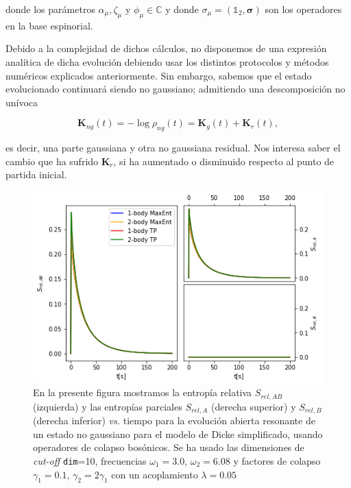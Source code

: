 \documentclass{report} %
\numberwithin{equation}{section}
\begin{document}
donde los parámetros $\alpha_{\mu},  \zeta_{\mu}$ y $\phi_{\mu} \in \mathds{C}$ y donde $\sigma_{\mu} = (\mathds{1}_2, {\boldsymbol \sigma})$ son los operadores en la base espinorial. 

Debido a la complejidad de dichos cálculos, no disponemos de una expresión analítica de dicha evolución debiendo usar los distintos protocolos y métodos numéricos explicados anteriormente. Sin embargo, sabemos que el estado evolucionado continuará siendo no gaussiano; admitiendo una descomposición no unívoca

$$
\mathbf{K}_{ng}(t) = -\log \rho_{ng}(t) = \mathbf{K}_{g}(t)+\mathbf{K}_{r}(t),
$$

es decir, una parte gaussiana y otra no gaussiana residual. Nos interesa saber el cambio que ha sufrido $\mathbf{K}_{r}$, si ha aumentado o disminuido respecto al punto de partida inicial. 

\begin{figure}
    \centering
    \includegraphics[scale=0.7]{figs/section3_4/section5_bxs_ng/rel_entropy_open_nonres_ng.png}
    \caption{En la presente figura mostramos la entropía relativa $S_{rel,AB}$ (izquierda) y las entropías parciales $S_{rel,A}$ (derecha superior) y $S_{rel,B}$ (derecha inferior) \textit{vs.} tiempo para la evolución abierta resonante de un estado no gaussiano para el modelo de Dicke simplificado, usando operadores de colapso bosónicos. Se ha usado las dimensiones de \textit{cut-off} \texttt{dim}=10, frecuencias $\omega_1 = 3.0$, $\omega_2 = 6.08$ y factores de colapso $\gamma_1 = 0.1$, $\gamma_2 = 2 \gamma_1$ con un acoplamiento $\lambda= 0.05$}
    \label{rels_open-nr}
\end{figure}
\end{document}
